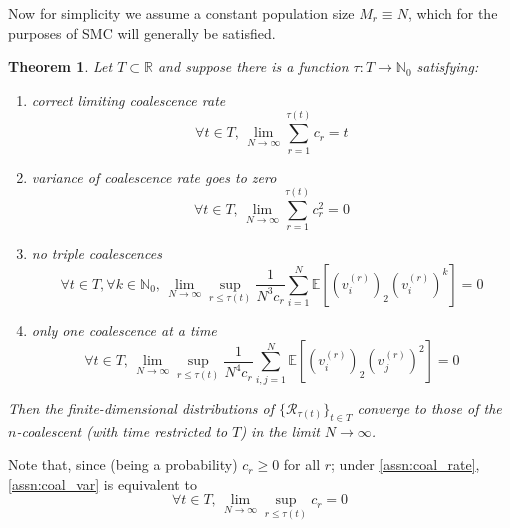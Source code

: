 \documentclass{article}
\newcommand{\E}{\mathbb{E}}
\newtheorem{thm}{Theorem}
\begin{document}
Now for simplicity we assume a constant population size $M_r \equiv N$, which for the purposes of SMC will generally be satisfied.
\begin{thm}
Let $T \subset \mathbb{R}$ and suppose there is a function $\tau : T \to \mathbb{N}_0$ satisfying:
\begin{enumerate}[label=(\Alph*)]
\item\label{assn:coal_rate} correct limiting coalescence rate
\begin{equation*}
\forall t \in T, \,\lim_{N\to\infty} \sum_{r=1}^{\tau(t)} c_r =t
\end{equation*}

\item\label{assn:coal_var} variance of coalescence rate goes to zero
\begin{equation*}
\forall t \in T, \,\lim_{N\to\infty} \sum_{r=1}^{\tau(t)} c_r^2 =0
\end{equation*}

\item\label{assn:triple_coal} no triple coalescences
\begin{equation*}
\forall t \in T, \forall k\in\mathbb{N}_0,\, \lim_{N\to\infty} \sup_{r\leq\tau(t)} \frac{1}{N^3 c_r} \sum_{i=1}^N \E\left[ (v_i^{(r)})_2 (v_i^{(r)})^k \right] =0
\end{equation*}

\item\label{assn:multi_coal} only one coalescence at a time
\begin{equation*}
\forall t \in T,\, \lim_{N\to\infty} \sup_{r\leq\tau(t)} \frac{1}{N^4 c_r} \sum_{i,j=1}^N \E\left[ (v_i^{(r)})_2 (v_j^{(r)})^2 \right] =0
\end{equation*}
\end{enumerate}
Then the finite-dimensional distributions of $\{\mathcal{R}_{\tau(t)}\}_{t\in T}$ converge to those of the $n$-coalescent (with time restricted to $T$) in the limit $N\to\infty$.
\end{thm}
Note that, since (being a probability) $c_r \geq 0$ for all $r$; under \ref{assn:coal_rate}, \ref{assn:coal_var} is equivalent to
\begin{equation}
\forall t \in T,\, \lim_{N\to\infty} \sup_{r\leq\tau(t)} c_r =0
\end{equation}
\end{document}
